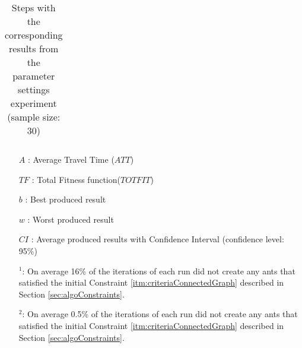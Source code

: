 \begin{sidewaystable}
\begin{tabular}{|l|l|l|l|l||c|c|c|c|c|c|c|}
  
    \hline
    \end{tabular}
    \caption {Steps with the corresponding results from the parameter settings experiment (sample size: 30)}
    \tiny
    \begin{itemize}[noitemsep]
    \item[$A$ :] Average Travel Time ($ATT$)
    \item[$TF$ :] Total Fitness function($TOTFIT$)
    \item[$b$ :] Best produced result
    \item[$w$ :] Worst produced result
    \item[$CI$ :] Average produced results with Confidence Interval (confidence level: 95\%)
    \item[$^1$:] On average 16\% of the iterations of each run did not create any ants that satisfied the initial Constraint \ref{itm:criteriaConnectedGraph} described in Section \vref{sec:algoConstraints}.
    \item[$^2$:] On average 0.5\% of the iterations of each run did not create any ants that satisfied the initial Constraint \ref{itm:criteriaConnectedGraph} described in Section \vref{sec:algoConstraints}.
    \end{itemize}
    \label{table:pm1}
\end{sidewaystable}

